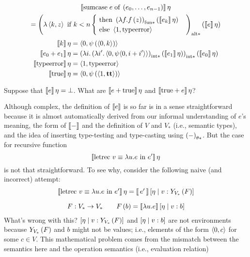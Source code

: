 \begin{enumcirc}
	\begin{multline*}
		\left\llbracket \textrm{sumcase} \; e \; \textrm{of} \; \left( e_0, \dots, e_{n-1} \right) \right\rrbracket \eta \\
		= \left( 
			\lambda \left\langle k, z \right\rangle \textrm{ if } k < n
			\begin{cases}
				\textrm{ then } \left( \lambda f . f \left( z \right) \right)_{\textrm{fun}*} \left( \left\llbracket e_k \right\rrbracket \eta \right) \\
				\textrm{ else } \left\langle 1, \textrm{typeerror} \right\rangle
			\end{cases}
		 \right)_{\textrm{alt}*} \left( \left\llbracket e \right\rrbracket \eta \right)
	\end{multline*}
	\begin{align*}
		\left\llbracket k \right\rrbracket \eta                  & = \left\langle 0, \psi \left( \left\langle 0, k \right\rangle \right) \right\rangle    \\
		\left\llbracket e_0 + e_1 \right\rrbracket \eta          & = \left( 
			\lambda i . \left( 
				\lambda i' . \left\langle 0, \psi{\left\langle 0, i + i' \right\rangle} \right\rangle
			 \right)_{\textrm{int}*} \left( \left\llbracket e_1 \right\rrbracket \eta \right)
		 \right)_{\textrm{int}*} \left( \left\llbracket e_0 \right\rrbracket \eta \right)                                        \\
		\left\llbracket \textrm{typeerror} \right\rrbracket \eta & = \left\langle 1, \textrm{typeerror} \right\rangle              \\
		\left\llbracket \textrm{true} \right\rrbracket \eta              & = \left\langle 0, \psi \left( \left\langle 1, \textbf{tt} \right\rangle \right) \right\rangle \\
	\end{align*}

	\begin{exercisetab}
		Suppose that $\left\llbracket e \right\rrbracket \eta = \bot$.
		What are $\left\llbracket e + \textrm{true} \right\rrbracket \eta$ and $\left\llbracket \textrm{true} + e \right\rrbracket \eta$?
	\end{exercisetab}
	\item
	Although complex, the definition of $\left\llbracket e \right\rrbracket$ is so far is in a sense
	straightforward because it is almost automatically derived from our informal
	understanding of $e$'s meaning,
	the form of $\left\llbracket - \right\rrbracket$ and the definition of $V$ and $V_*$ (i.e., semantic
	types), and the idea of inserting type-testing and type-casting using
	$\left( - \right)_{\theta *}$.
	But the case for recursive function
	\[
		\left\llbracket \textrm{letrec } v \equiv \lambda u . e \textrm{ in } e' \right\rrbracket \eta
	\]
	is not that straightforward.
	To see why, consider the following naive (and incorrect) attempt:
	\[
		\begin{array}{c}
			\left\llbracket \textrm{letrec } v \equiv \lambda u . e \textrm{ in } e' \right\rrbracket \eta =
			\left\llbracket \,e'\, \right\rrbracket \left[ \eta \; \middle\vert \; v: Y_{V_*}\left( F \right) \right] \\[1em]
			F: V_* \to V_* \qquad F\left( b \right) = \left\llbracket \lambda u . e \right\rrbracket \left[ \eta \; \middle\vert \; v: b \right]
		\end{array}
	\]
	What's wrong with this?
	$\left[ \eta \; \middle\vert \; v: Y_{V_*}\left( F \right) \right]$ and $\left[ \eta \; \middle\vert \; v: b \right]$ are not environments
	because $Y_{V_*}\left( F \right)$ and $b$ might not be values; i.e., elements of the
	form $\left\langle 0, c \right\rangle$ for some $c \in V$.
	This mathematical problem comes from the mismatch between the semantics here
	and the operation semantics
	(i.e., evaluation relation)


\end{enumcirc}
